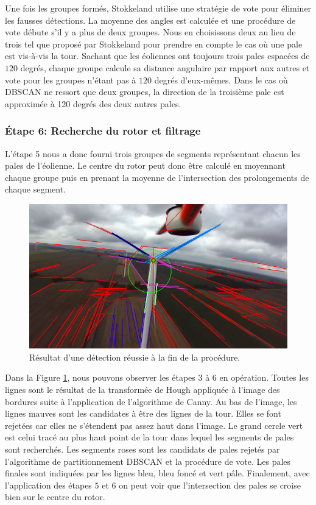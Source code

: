 Une fois les groupes formés, Stokkeland utilise une stratégie de vote pour éliminer les fausses détections. La moyenne des angles est calculée et une procédure de vote débute s'il y a plus de deux groupes. Nous en choisissons deux au lieu de trois tel que proposé par Stokkeland pour prendre en compte le cas où une pale est vis-à-vis la tour. Sachant que les éoliennes ont toujours trois pales espacées de $120$ degrés, chaque groupe calcule sa distance angulaire par rapport aux autres et vote pour les groupes n'étant pas à $120$ degrés d’eux-mêmes. Dans le cas où DBSCAN ne ressort que deux groupes, la direction de la troisième pale est approximée à 120 degrés des deux autres pales.

\subsubsection{Étape 6: Recherche du rotor et filtrage}

L'étape 5 nous a donc fourni trois groupes de segments représentant chacun les pales de l'éolienne. Le centre du rotor peut donc être calculé en moyennant chaque groupe puis en prenant la moyenne de l'intersection des prolongements de chaque segment.

\begin{figure}[htb]
  \centering
  \includegraphics[width=0.8\linewidth]{images/turbine_detect_result.png}
  \caption{Résultat d'une détection réussie à la fin de la procédure.}
  \label{fig:detect_result_step6}
\end{figure}

Dans la Figure \ref{fig:detect_result_step6}, nous pouvons observer les étapes $3$ à $6$ en opération. Toutes les lignes sont le résultat de la transformée de Hough appliquée à l'image des bordures suite à l'application de l'algorithme de Canny. Au bas de l'image, les lignes mauves sont les candidates à être des lignes de la tour. Elles se font rejetées car elles ne s'étendent pas assez haut dans l'image. Le grand cercle vert est celui tracé au plus haut point de la tour dans lequel les segments de pales sont recherchés. Les segments roses sont les candidats de pales rejetés par l'algorithme de partitionnement DBSCAN et la procédure de vote.
Les pales finales sont indiquées par les lignes bleu, bleu foncé et vert pâle. Finalement, avec l'application des étapes $5$ et $6$ on peut voir que l'intersection des pales se croise bien sur le centre du rotor.

